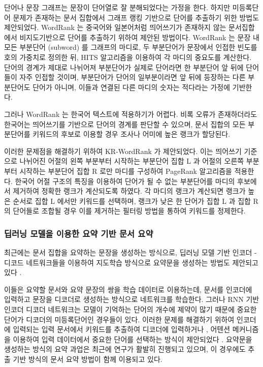 \documentclass[11pt]{article}
\begin{document}
단어나 문장 그래프는 문장이 단어열로 잘 분해되었다는 가정을 한다.
하지만 미등록단어 문제가 존재하는 문서 집합에서 그래프 랭킹 기반으로 단어를 추출하기 위한 방법도 제안되었다.
WordRank \citep{chen2011simple} 는 중국어와 일본어처럼 띄어쓰기가 존재하지 않는 문서집합에서 비지도기반으로 단어를 추출하기 위하여 제안된 방법이다.
WordRank 는 문장 내 모든 부분단어 (subword) 를 그래프의 마디로, 두 부분단어가 문장에서 인접한 빈도를 호의 가중치로 정의한 뒤, HITS 알고리즘을 이용하여 각 마디의 중요도를 계산한다.
단어의 경계가 제대로 나뉘어져 부분단어가 실제로 단어라면 한 부분단어 앞 뒤에 단어들이 자주 인접할 것이며, 부분단어가 단어의 일부분이라면 앞 뒤에 등장하는 다른 부분단어도 단어가 아니며, 이들과 연결된 다른 마디의 숫자는 적다라는 가정에 기반한다.

그러나 WordRank 는 한국어 텍스트에 적용하기가 어렵다.
비록 오류가 존재하더라도 한국어는 띄어쓰기를 기반으로 단어의 경계를 판단할 수 있으며, 문서 집합의 모든 부분단어를 키워드의 후보로 이용할 경우 조사나 어미에 높은 랭크가 할당된다.

이러한 문제점을 해결하기 위하여 KR-WordRank \citep{kim2014kr} 가 제안되었다.
이는 띄어쓰기 기준으로 나뉘어진 어절의 왼쪽 부분부터 시작하는 부분단어 집합 L 과 어절의 오른쪽 부분부터 시작하는 부분단어 집합 R 로만 마디를 구성하여 PageRank 알고리즘을 적용한다.
한국어 어절 구조의 특징을 이용하여 단어가 될 수 없는 부분단어를 마디의 후보에서 제거하여 정확한 랭크가 계산되도록 하였다.
각 마디의 랭크가 계산되면 랭크가 높은 순서로 집합 L 에서만 키워드를 선택하며, 랭크가 낮은 한 단어가 집합 L 과 집합 R 의 단어들로 조합될 경우 이를 제거하는 필터링 방법을 통하여 키워드를 정제한다.

\subsubsection{딥러닝 모델을 이용한 요약 기반 문서 요약}

최근에는 문서 집합을 요약하는 문장을 생성하는 방식으로, 딥러닝 모델 기반 인코더 - 디코드 네트워크들을 이용하여 지도학습 방식으로 요약문을 생성하는 방법도 제안되고 있다 \citep{rush2015neural}.

이들은 요약할 문서와 요약 문장의 쌍을 학습 데이터로 이용하는데, 문서를 인코더에 입력하고 문장을 디코더로 생성하는 방식으로 네트워크를 학습한다.
그러나 RNN 기반 인코더 디코더 네트워크는 모델이 기억하는 단어의 개수에 제약이 많기 때문에 중요한 단어가 디코더의 미등록단어인 경우들이 있다.
이러한 문제를 해결하기 위하여 인코더에 입력되는 입력 문서에서 키워드를 추출하여 디코더에 입력하거나 \citep{nallapati2016abstractive}, 어텐션 메커니즘을 이용하여 입력 데이터에서 중요한 단어를 선택하는 방식이 제안되었다 \citep{see2017get, gu2016incorporating}.
요약문을 생성하는 방식의 요약 과업은 최근에 연구가 활발히 진행되고 있으며, 이 경우에도 추출 기반 방식의 문서 요약 방법이 함께 이용되고 있다.
\end{document}
